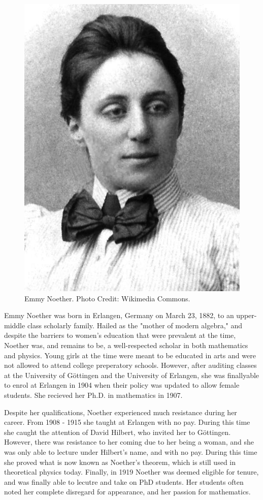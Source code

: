 \documentclass[../../../include/open-logic-section]{subfiles}
\begin{document}
\begin{figure}[h!] 
\centering 
\includegraphics[scale=1]{emmy-noether.png}
\caption{Emmy Noether. Photo Credit: Wikimedia Commons.} 
\end{figure}
 Emmy
Noether was born in Erlangen, Germany on March 23, 1882, to an upper-middle
class scholarly family. Hailed as the "mother of modern algebra," and
despite the barriers to women's education that were prevalent at the time,
Noether was, and remains to be, a well-respected scholar in both
mathematics and physics. Young girls at the time were meant to be educated
in arts and were not allowed to attend college preperatory schools.
However, after auditing classes at the University of G\"{o}ttingen and the
University of Erlangen, she was finallyable to enrol at Erlangen in 1904
when their policy was updated to allow female students. She recieved her
Ph.D. in mathematics in 1907.

Despite her qualifications, Noether experienced much resistance during her
career. From 1908 - 1915 she taught at Erlangen with no pay. During this
time she caught the attention of David Hilbert, who invited her to
G\"{o}ttingen. However, there was resistance to her coming due to her being
a woman, and she was only able to lecture under Hilbert's name, and with no
pay. During this time she proved what is now known as Noether's theorem,
which is still used in theoretical physics today. Finally, in 1919 Noether
was deemed eligible for tenure, and was finally able to lecutre and take on
PhD students. Her students often noted her complete disregard for
appearance, and her passion for mathematics.
\end{document}

